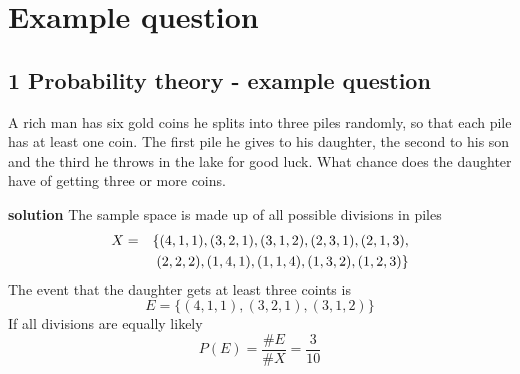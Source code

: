 
\ifind
\section*{Example question}
\else
\subsection*{1 Probability theory - example question}
\fi

A rich man has six gold coins he splits into three piles randomly, so
that each pile has at least one coin. The first pile he gives to his
daughter, the second to his son and the third he throws in the lake
for good luck. What chance does the daughter have of getting three or more coins.

\noindent \textbf{solution} The sample space is made up of all possible divisions in piles
\begin{eqnarray}
  X&=&\{(4,1,1),(3,2,1),(3,1,2),(2,3,1),(2,1,3),\cr &&(2,2,2),(1,4,1),(1,1,4),(1,3,2),(1,2,3)\}
\end{eqnarray}
The event that the daughter gets at least three coints is
\begin{equation}
  E=\{(4,1,1),(3,2,1),(3,1,2)\}
\end{equation}
If all divisions are equally likely
\begin{equation}
  P(E)=\frac{\#E}{\#X}=\frac{3}{10}
\end{equation}
